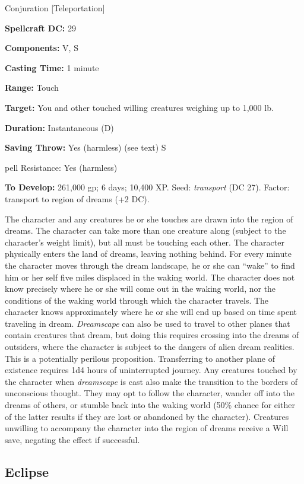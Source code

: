 \documentclass{article}
\begin{document}
Conjuration [Teleportation] 

\textbf{Spellcraft DC:} 29 

\textbf{Components:} V, S 

\textbf{Casting Time:} 1 minute 

\textbf{Range:} Touch 

\textbf{Target:} You and other touched willing creatures weighing up to 1,000 lb. 

\textbf{Duration:} Instantaneous (D) 

\textbf{Saving Throw:} Yes (harmless) (see text) S

pell Resistance: Yes (harmless) 

\textbf{To Develop:} 261,000 gp; 6 days; 10,400 XP. Seed: \textit{transport }(DC 
27). Factor: transport to region of dreams (+2 DC). 

The character and any creatures he or she touches are drawn into the region of 
dreams. The character can take more than one creature along (subject to the character's 
weight limit), but all must be touching each other. The character physically enters 
the land of dreams, leaving nothing behind. For every minute the character moves 
through the dream landscape, he or she can ``wake'' to find him or her self five 
miles displaced in the waking world. The character does not know precisely where 
he or she will come out in the waking world, nor the conditions of the waking world 
through which the character travels. The character knows approximately where he 
or she will end up based on time spent traveling in dream. \textit{Dreamscape }can 
also be used to travel to other planes that contain creatures that dream, but doing 
this requires crossing into the dreams of outsiders, where the character is subject 
to the dangers of alien dream realities. This is a potentially perilous proposition. 
Transferring to another plane of existence requires 1d4 hours of uninterrupted 
journey. Any creatures touched by the character when \textit{dreamscape }is cast 
also make the transition to the borders of unconscious thought. They may opt to 
follow the character, wander off into the dreams of others, or stumble back into 
the waking world (50\% chance for either of the latter results if they are lost 
or abandoned by the character). Creatures unwilling to accompany the character 
into the region of dreams receive a Will save, negating the effect if successful. 

\vspace{12pt}
\subsection*{Eclipse }
\end{document}
